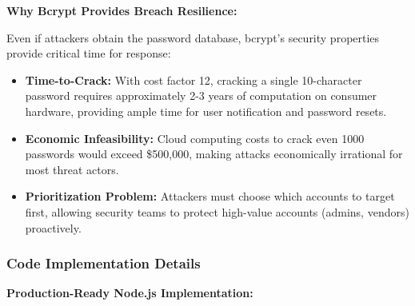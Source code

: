 \documentclass[12pt,a4paper]{article}
\begin{document}
\vspace{0.5em}

\textbf{Why Bcrypt Provides Breach Resilience:}

Even if attackers obtain the password database, bcrypt's security properties provide critical time for response:

\begin{itemize}[leftmargin=2em, itemsep=6pt]
    \item \textbf{Time-to-Crack:} With cost factor 12, cracking a single 10-character password requires approximately 2-3 years of computation on consumer hardware, providing ample time for user notification and password resets.
    \item \textbf{Economic Infeasibility:} Cloud computing costs to crack even 1000 passwords would exceed \$500,000, making attacks economically irrational for most threat actors.
    \item \textbf{Prioritization Problem:} Attackers must choose which accounts to target first, allowing security teams to protect high-value accounts (admins, vendors) proactively.
\end{itemize}

\subsubsection{Code Implementation Details}

\textbf{Production-Ready Node.js Implementation:}
\end{document}
